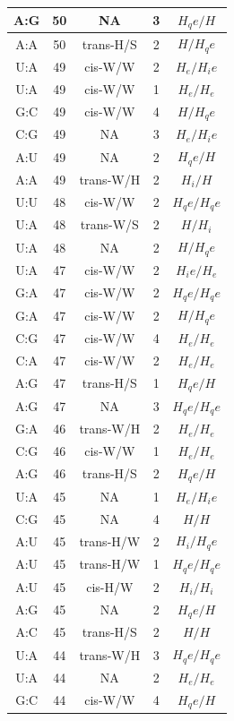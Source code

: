 \begin{center}
\begin{longtable}{c|c|c|c|c}
A:G & 50 & NA & 3 & $H_qe/H$ \\  \hline
A:A & 50 & trans-H/S & 2 & $H/H_qe$ \\  \hline
U:A & 49 & cis-W/W & 2 & $H_e/H_ie$ \\  \hline
U:A & 49 & cis-W/W & 1 & $H_e/H_e$ \\  \hline
G:C & 49 & cis-W/W & 4 & $H/H_qe$ \\  \hline
C:G & 49 & NA & 3 & $H_e/H_ie$ \\  \hline
A:U & 49 & NA & 2 & $H_qe/H$ \\  \hline
A:A & 49 & trans-W/H & 2 & $H_i/H$ \\  \hline
U:U & 48 & cis-W/W & 2 & $H_qe/H_qe$ \\  \hline
U:A & 48 & trans-W/S & 2 & $H/H_i$ \\  \hline
U:A & 48 & NA & 2 & $H/H_qe$ \\  \hline
U:A & 47 & cis-W/W & 2 & $H_ie/H_e$ \\  \hline
G:A & 47 & cis-W/W & 2 & $H_qe/H_qe$ \\  \hline
G:A & 47 & cis-W/W & 2 & $H/H_qe$ \\  \hline
C:G & 47 & cis-W/W & 4 & $H_e/H_e$ \\  \hline
C:A & 47 & cis-W/W & 2 & $H_e/H_e$ \\  \hline
A:G & 47 & trans-H/S & 1 & $H_qe/H$ \\  \hline
A:G & 47 & NA & 3 & $H_qe/H_qe$ \\  \hline
G:A & 46 & trans-W/H & 2 & $H_e/H_e$ \\  \hline
C:G & 46 & cis-W/W & 1 & $H_e/H_e$ \\  \hline
A:G & 46 & trans-H/S & 2 & $H_qe/H$ \\  \hline
U:A & 45 & NA & 1 & $H_e/H_ie$ \\  \hline
C:G & 45 & NA & 4 & $H/H$ \\  \hline
A:U & 45 & trans-H/W & 2 & $H_i/H_qe$ \\  \hline
A:U & 45 & trans-H/W & 1 & $H_qe/H_qe$ \\  \hline
A:U & 45 & cis-H/W & 2 & $H_i/H_i$ \\  \hline
A:G & 45 & NA & 2 & $H_qe/H$ \\  \hline
A:C & 45 & trans-H/S & 2 & $H/H$ \\  \hline
U:A & 44 & trans-W/H & 3 & $H_qe/H_qe$ \\  \hline
U:A & 44 & NA & 2 & $H_e/H_e$ \\  \hline
G:C & 44 & cis-W/W & 4 & $H_qe/H$ \\  \hline

\end{longtable}
\end{center}
